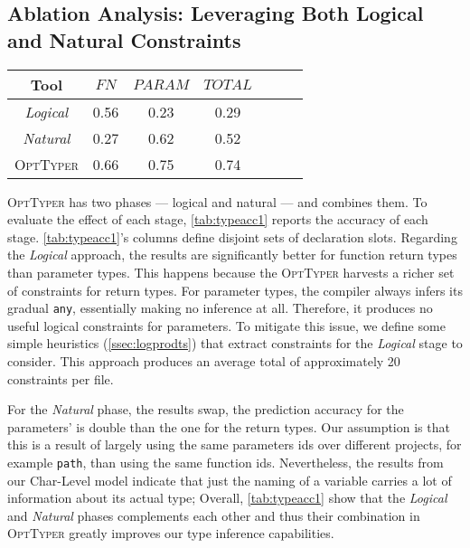 \documentclass[acmsmall, review, anonymous]{acmart}\settopmatter{printfolios=true,printccs=false,printacmref=false}
\newcommand{\projectname}{\textsc{OptTyper}\xspace}
\begin{document}
\subsection{Ablation Analysis:  Leveraging Both Logical and Natural Constraints}\label{ssec:ablation}
\begin{table*}[t]
	\centering
	\caption{Ablation analysis of \projectname, the cells report accuracy; FN refers to return types of functions and PARAM
	represents parameters.}
\label{tab:typeacc1}
	\begin{tabular}{ccccccc}
		\toprule
		Tool  & $\textit{FN}$ & 
		$\textit{PARAM}$ & $\textit{TOTAL}$ \\
		
		\midrule
		\textit{Logical}      & 0.56                                   & 0.23                                 & 0.29                                  \\
		\textit{Natural}      & 0.27                                    & 0.62                                 & 0.52                                   \\
		\projectname  & 0.66         & 0.75         & 0.74\\
		\bottomrule
	\end{tabular}
\end{table*}
\projectname has two phases --- logical and natural --- and combines them.  To evaluate the effect of each stage, \cref{tab:typeacc1} reports the accuracy of each stage.
\cref{tab:typeacc1}'s columns define disjoint sets of declaration slots.
Regarding the \textit{Logical} approach, the results are significantly better for function return types
than parameter types.
This happens because the \projectname harvests a richer set of constraints for return types.
For parameter types, the compiler always 
infers its gradual \texttt{\small{any}}, essentially making no inference at all. Therefore, it produces no useful logical constraints for parameters.
To mitigate this issue, we define some simple heuristics (\cref{ssec:logprodts}) that extract constraints for the \textit{Logical} stage to consider. This approach produces an average total of approximately 20 constraints per file. 

For the \textit{Natural} phase, the results swap, the prediction accuracy for the parameters' is double than the one for the return types. Our assumption is that
this is a result of largely using the same parameters ids over different projects, for example \lstinline{path}, than using the same function ids. Nevertheless, the results from our Char-Level model indicate that just the naming of a variable carries a
lot of information about its actual type;   
Overall, \cref{tab:typeacc1} show that the \textit{Logical} and \textit{Natural} phases complements each other and thus their combination in \projectname greatly improves our type inference capabilities.
\end{document}
